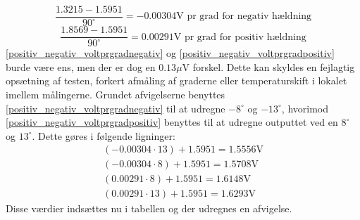 \begin{equation}\label{positiv_negativ_voltprgradnegativ} 
\dfrac{1.3215 - 1.5951}{90^\circ} = -0.00304\text{V pr grad for negativ hældning}
\end{equation}
\begin{equation}\label{positiv_negativ_voltprgradpositiv}
\dfrac{1.8569 - 1.5951}{90^\circ} = 0.00291\text{V pr grad for positiv hældning}
\end{equation}
\eqref{positiv_negativ_voltprgradnegativ} og \eqref{positiv_negativ_voltprgradpositiv} burde være ens, men der er dog en $0.13\mu$V forskel. Dette kan skyldes en fejlagtig opsætning af testen, forkert afmåling af graderne eller temperaturskift i lokalet imellem målingerne. Grundet afvigelserne benyttes \eqref{positiv_negativ_voltprgradnegativ} til at udregne $-8^\circ$ og $-13^\circ$, hvorimod \eqref{positiv_negativ_voltprgradpositiv} benyttes til at udregne outputtet ved en $8^\circ$ og $13^\circ$. Dette gøres i følgende ligninger:
\begin{align}
(-0.00304 \cdot 13) + 1.5951 = 1.5556\text{V} \\
(-0.00304 \cdot 8) + 1.5951 = 1.5708\text{V}  \\
(0.00291 \cdot 8) + 1.5951 = 1.6148\text{V}  \\
(0.00291 \cdot 13) + 1.5951 = 1.6293\text{V}
\end{align}
Disse værdier indsættes nu i tabellen og der udregnes en afvigelse.

